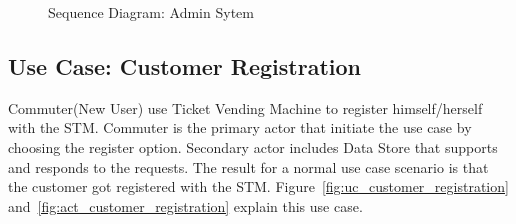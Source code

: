 \documentclass[a4paper,12pt]{report}
\begin{document}
\begin{figure}[!htbp]
	\centering
	\caption{\label{fig:seq_admin_system} Sequence Diagram: Admin Sytem}	
\end{figure}


\FloatBarrier
\subsection{Use Case: Customer Registration}
Commuter(New User) use Ticket Vending Machine to register himself/herself with the STM. Commuter is the primary actor that initiate the use case by choosing the register option. Secondary actor includes Data Store that supports and responds to the requests. The result for a normal use case scenario is that the customer got registered with the STM. Figure~\ref{fig:uc_customer_registration} and~\ref{fig:act_customer_registration} explain this use case. \\ 
\end{document}
